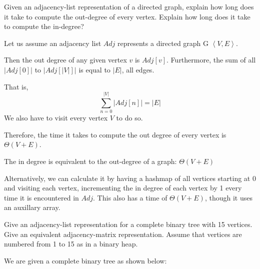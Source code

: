 \documentclass[addpoints,11pt]{exam}
\begin{document}
\begin{questions}


\question[10] Given an adjacency-list representation of a directed graph, explain how long does it take to compute the out-degree of every vertex.  Explain how long does it take to compute the in-degree?
\begin{solutionorbox}
    Let us assume an adjacency list $Adj$ represents a  directed graph G $\left< V, E \right>$.
    
    Then the out degree of any given vertex $v$ is $Adj[v]$. Furthermore, the sum of all $|Adj[0]|$ to $|Adj[|V|]|$ is equal to $|E|$, all edges.
    
    That is, \[ \sum_{n=0}^{|V|} |Adj[n]| = |E| \]
    We also have to visit every vertex $V$ to do so.
    
    Therefore, the time it takes to compute the out degree of every vertex is $\Theta(V+E)$.
    
    The in degree is equivalent to the out-degree of a graph:  $\Theta(V+E)$
    
    Alternatively, we can calculate it by having a hashmap of all vertices starting at 0 and visiting each vertex, incrementing the in degree of each vertex by 1 every time it is encountered in $Adj$. This also has a time of  $\Theta(V+E)$, though it uses an auxillary array.  
\end{solutionorbox}

\newpage


\question[10] Give an adjacency-list representation for a complete binary tree with 15 vertices.  Give an equivalent adjacency-matrix representation.  Assume that vertices are numbered from 1 to 15 as in a binary heap.
\begin{solutionorbox}
	We are given a complete binary tree as shown below:
	


\end{solutionorbox}
\end{questions}
\end{document}
